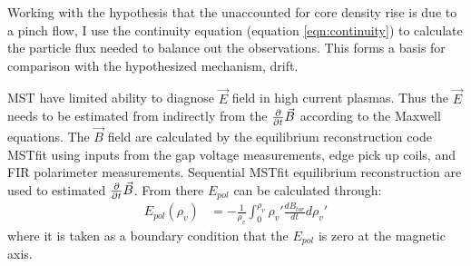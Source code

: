 Working with the hypothesis that the unaccounted for core density rise is due to a pinch flow, I use the continuity equation (equation \ref{eqn:continuity}) to calculate the particle flux needed to balance out the observations. This forms a basis for comparison with the hypothesized mechanism, \ecb drift.


MST have limited ability to diagnose $\vec{E}$ field in high current plasmas. Thus the $\vec{E}$ needs to be estimated from indirectly from the $\frac{\partial}{\partial t}\vec{B}$ according to the Maxwell equations. The $\vec{B}$ field are calculated by the equilibrium reconstruction code MSTfit using inputs from the gap voltage measurements, edge pick up coils, and FIR polarimeter measurements. Sequential MSTfit equilibrium reconstruction are used to estimated $\frac{\partial}{\partial t}\vec{B}$. From there $E_{pol}$ can be calculated through:
\begin{align}
   E_{pol}(\rho_v) & = -\frac{1}{\rho_v}\int_{0}^{\rho_v}\rho_v' \frac{dB_{tor}}{dt} d\rho_v'
\end{align}
where it is taken as a boundary condition that the $E_{pol}$ is zero at the magnetic axis.

